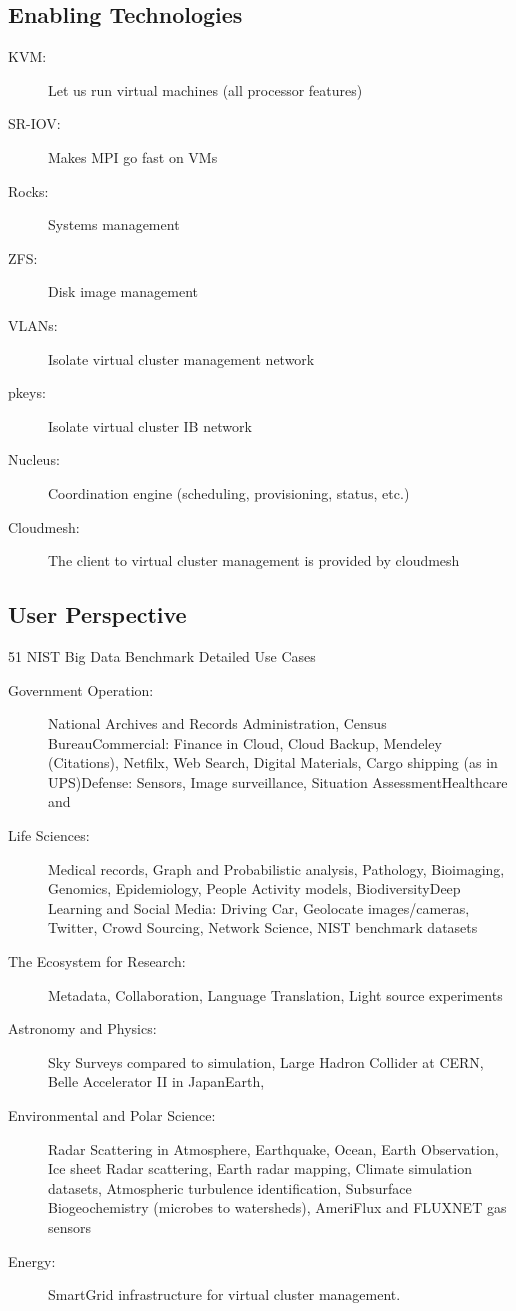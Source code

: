 \subsection{Enabling Technologies}
\begin{description}
\item[KVM:] Let us run virtual machines (all processor features)
\item[SR-IOV:] Makes MPI go fast on VMs
\item[Rocks:] Systems management
\item[ZFS:] Disk image management
\item[VLANs:] Isolate virtual cluster management network
\item[pkeys:] Isolate virtual cluster IB network
\item[Nucleus:] Coordination engine (scheduling, provisioning, status,
  etc.)
\item[Cloudmesh:] The client to virtual cluster management is
  provided by cloudmesh 
\end{description}


\subsection{User Perspective}

51 NIST Big Data Benchmark Detailed Use Cases

\begin{description}
\item [Government Operation:] National Archives and Records
  Administration, Census BureauCommercial: Finance in Cloud, Cloud
  Backup, Mendeley (Citations), Netfilx, Web Search, Digital
  Materials, Cargo shipping (as in UPS)Defense: Sensors, Image
  surveillance, Situation AssessmentHealthcare and
\item[Life Sciences:] Medical records, Graph and Probabilistic
  analysis, Pathology, Bioimaging, Genomics, Epidemiology, People
  Activity models, BiodiversityDeep Learning and Social Media: Driving
  Car, Geolocate images/cameras, Twitter, Crowd Sourcing, Network
  Science, NIST benchmark datasets
\item[The Ecosystem for Research:] Metadata, Collaboration, Language
  Translation, Light source experiments
\item[Astronomy and Physics:] Sky Surveys compared to simulation,
  Large Hadron Collider at CERN, Belle Accelerator II in JapanEarth,
\item[Environmental and Polar Science:] Radar Scattering in
  Atmosphere, Earthquake, Ocean, Earth Observation, Ice sheet Radar
  scattering, Earth radar mapping, Climate simulation datasets,
  Atmospheric turbulence identification, Subsurface Biogeochemistry
  (microbes to watersheds), AmeriFlux and FLUXNET gas sensors
\item[Energy:] SmartGrid infrastructure for virtual cluster management.
\end{description}



